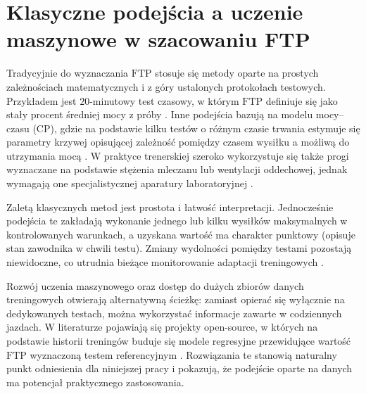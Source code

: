 \section{Klasyczne podejścia a uczenie maszynowe w szacowaniu FTP}

Tradycyjnie do wyznaczania $\mathrm{FTP}$ stosuje się metody oparte na prostych zależnościach matematycznych i z góry ustalonych protokołach testowych.
Przykładem jest $20$-minutowy test czasowy, w którym $\mathrm{FTP}$ definiuje się jako stały procent średniej mocy z próby \cite{allen2019power,sitko2023_ac20to60_update,phasescycling2023_ftp_variability}.
Inne podejścia bazują na modelu mocy--czasu ($\mathrm{CP}$), gdzie na podstawie kilku testów o różnym czasie trwania estymuje się parametry krzywej opisującej zależność pomiędzy czasem wysiłku a możliwą do utrzymania mocą \cite{denham2020predictftp}.
W praktyce trenerskiej szeroko wykorzystuje się także progi wyznaczane na podstawie stężenia mleczanu lub wentylacji oddechowej, jednak wymagają one specjalistycznej aparatury laboratoryjnej \cite{borszcz2018ftp,karsten2021cpftp}.

Zaletą klasycznych metod jest prostota i łatwość interpretacji.
Jednocześnie podejścia te zakładają wykonanie jednego lub kilku wysiłków maksymalnych w kontrolowanych warunkach, a uzyskana wartość ma charakter punktowy (opisuje stan zawodnika w chwili testu).
Zmiany wydolności pomiędzy testami pozostają niewidoczne, co utrudnia bieżące monitorowanie adaptacji treningowych \cite{denham2020predictftp,phasescycling2023_ftp_variability}.

Rozwój uczenia maszynowego oraz dostęp do dużych zbiorów danych treningowych otwierają alternatywną ścieżkę: zamiast opierać się wyłącznie na dedykowanych testach, można wykorzystać informacje zawarte w codziennych jazdach.
W literaturze pojawiają się projekty open-source, w których na podstawie historii treningów buduje się modele regresyjne przewidujące wartość $\mathrm{FTP}$ wyznaczoną testem referencyjnym \cite{stockwell2023mlftp,denham2020predictftp}.
Rozwiązania te stanowią naturalny punkt odniesienia dla niniejszej pracy i pokazują, że podejście oparte na danych ma potencjał praktycznego zastosowania.

